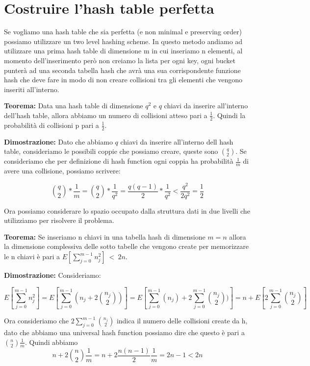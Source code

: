 \documentclass[14pt]{extreport}
\begin{document}
\section{Costruire l'hash table perfetta}

Se vogliamo una hash table che sia perfetta (e non minimal e preserving order) possiamo utilizzare un two level hashing scheme. 
In questo metodo andiamo ad utilizzare una prima hash table di dimensione m in cui inseriamo n elementi, al momento dell'inserimento però non creiamo la lista per ogni key, ogni bucket punterà ad una seconda tabella hash che avrà una sua corrispondente funzione hash che deve fare in modo di non creare collisioni tra gli elementi che vengono inseriti all'interno.

\textbf{Teorema:} Data una hash table di dimensione $q^2$ e $q$ chiavi da inserire all'interno dell'hash table, allora abbiamo un numero di collisioni atteso pari a $\frac{1}{2}$. Quindi la probabilità di collisioni p pari a $\frac{1}{2}$.

\textbf{Dimostrazione:} Dato che abbiamo $q$ chiavi da inserire all'interno dell hash table, consideriamo le possibili coppie che possiamo creare, queste sono $\binom{q}{2}$. 
Se consideriamo che per definizione di hash function ogni coppia ha probabilità $\frac{1}{m}$ di avere una collisione, possiamo scrivere:

\begin{equation}
\binom{q}{2}*\frac{1}{m} = \binom{q}{2}*\frac{1}{q^2} = \frac{q(q-1)}{2}*\frac{1}{q^2} < \frac{q^2}{2q^2} = \frac{1}{2}
\end{equation}

Ora possiamo considerare lo spazio occupato dalla struttura dati in due livelli che utilizziamo per risolvere il problema.

\textbf{Teorema:} Se inseriamo n chiavi in una tabella hash di dimensione $m=n$ allora la dimensione complessiva delle sotto tabelle che vengono create per memorizzare le n chiavi è pari a $E[\sum^{m-1}_{j=0}n_j^2]\ <\ 2n$.

\textbf{Dimostrazione:} Consideriamo:

\begin{equation}
E[\sum^{m-1}_{j=0}n_j^2] = E[\sum^{m-1}_{j=0}(n_j + 2\binom{n_j}{2})] = E[\sum^{m-1}_{j=0}(n_j) + 2\sum^{m-1}_{j=0}\binom{n_j}{2})] = n + E[2\sum^{m-1}_{j=0}\binom{n_j}{2}]
\end{equation}

Ora consideriamo che $2\sum^{m-1}_{j=0}\binom{n_j}{2}$ indica il numero delle collisioni create da h, dato che abbiamo una universal hash function possiamo dire che questo è pari a $\binom{n}{2}\frac{1}{m}$. Quindi abbiamo 
\begin{equation}
n + 2\binom{n}{2}\frac{1}{m} = n + 2\frac{n(n-1)}{2}\frac{1}{m} = 2n-1 < 2n
\end{equation}
\end{document}
